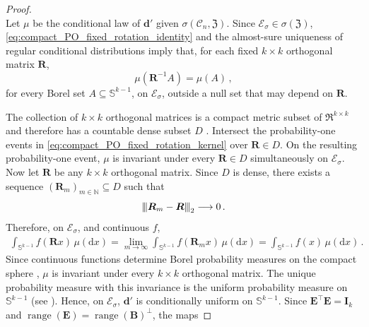 \documentclass{article}
\makeatletter
\theoremstyle{definition}
\newcommand{\vnorm}[1]{%
	\ensuremath{%
		\if@display
		\left\| #1 \right\|
		\else
		\| #1 \|
		\fi
	}%
}
\newcommand{\mnorm}[1]{{\left\vert\kern-0.25ex\left\vert\kern-0.25ex\left\vert #1
		\right\vert\kern-0.25ex\right\vert\kern-0.25ex\right\vert}}
\newcommand*{\bb}{\boldsymbol}
\newcommand{\range}{\operatorname{range}}
\makeatother
\begin{document}
\begin{bibunit}
\begin{proof}
\begin{equation}
\end{equation}
Let $\mu$ be the conditional law of $\bb d'$ given
$\sigma(\mathcal C_n,\bb{\mathfrak Z})$. Since
$
    \mathcal E_\sigma\in\sigma(\bb{\mathfrak Z})
$,
\eqref{eq:compact_PO_fixed_rotation_identity} and the almost-sure uniqueness
of regular conditional distributions \citep[Chapter~2, Section~7]{shiryaev:2016} imply that, for each fixed
$k\times k$ orthogonal matrix $\bb R$,
\begin{equation}
\label{eq:compact_PO_fixed_rotation_kernel}
    \mu(\bb R^{-1}A)
    =
    \mu(A) \,, 
\end{equation}
for every Borel set $A\subseteq\mathbb S^{k-1}$, on
$\mathcal E_\sigma$, outside a null set that may depend on $\bb R$.

The collection of $k\times k$ orthogonal matrices is a compact metric
subset of $\Re^{k\times k}$ and therefore has a countable dense subset
$D$ \citep[Lemma~3.26]{aliprantis+et+al:2006}. Intersect the probability-one events in
\eqref{eq:compact_PO_fixed_rotation_kernel} over $\bb R\in D$. On the
resulting probability-one event, $\mu$ is invariant under every
$\bb R\in D$ simultaneously on $\mathcal E_\sigma$.
Now let $\bb R$ be any $k\times k$ orthogonal matrix. Since $D$ is dense,
there exists a sequence $(\bb R_m)_{m\in\mathbb N}\subseteq D$ such that
$$
    \mnorm{\bb R_m-\bb R}_2
    \longrightarrow
    0\,.
$$
Therefore, on
$\mathcal E_\sigma$, and continuous $f$, 
\begin{equation}
\begin{aligned}
    \int_{\mathbb S^{k-1}}
    f(\bb Rx)\,\mu(\mathrm dx)
    =
    \lim_{m\to\infty}
    \int_{\mathbb S^{k-1}}
    f(\bb R_mx)\,\mu( \mathrm dx)
=
    \int_{\mathbb S^{k-1}}
    f(x)\,\mu(\mathrm  dx) \,. 
\end{aligned} 
\end{equation}
Since continuous functions determine Borel probability measures on the
compact sphere \citep[Lemma~9.3.2]{dudley:2018}, $\mu$ is invariant under every $k\times k$
orthogonal matrix. The unique probability measure with this invariance is
the uniform probability measure on $\mathbb S^{k-1}$ (see
\citealt[Theorem~4.4]{eaton:1989}). Hence, on $\mathcal E_\sigma$,
$\bb d'$ is conditionally uniform on $\mathbb S^{k-1}$. 
Since $\bb E^\top\bb E=\bb I_k$ and
$\range(\bb E)=\range(\bb B)^\perp$, the maps

\end{proof}
\end{bibunit}
\end{document}
